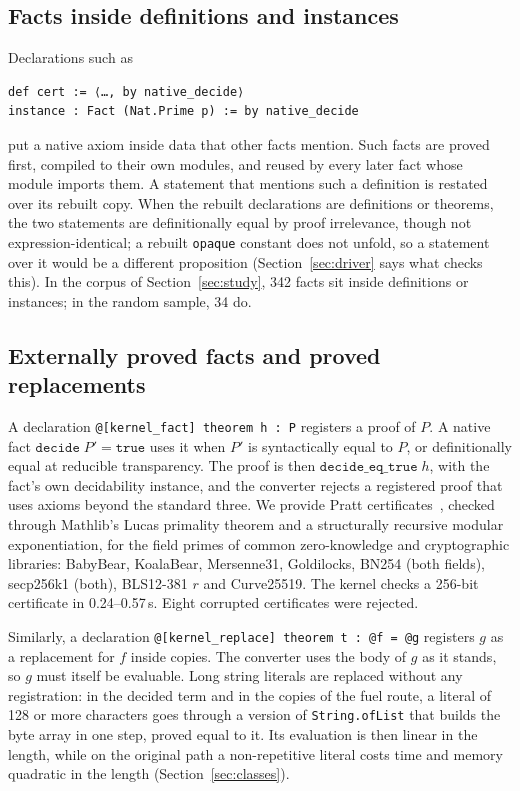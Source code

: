 \documentclass[11pt]{article}
\begin{document}
\subsection{Facts inside definitions and instances}\label{sec:inner}
Declarations such as
\begin{lstlisting}
def cert := ⟨…, by native_decide⟩
instance : Fact (Nat.Prime p) := by native_decide
\end{lstlisting}
\noindent put a native axiom inside data that other facts mention. Such facts are proved first, compiled to
their own modules, and reused by every later fact whose module imports them. A statement that
mentions such a definition is restated over its rebuilt copy. When the rebuilt declarations are
definitions or theorems, the two statements are definitionally equal by proof irrelevance, though not
expression-identical; a rebuilt \texttt{opaque} constant does not unfold, so a statement over it would be
a different proposition (Section~\ref{sec:driver} says what checks this). In the corpus of
Section~\ref{sec:study}, 342 facts sit inside definitions or instances; in the random sample, 34 do.

\subsection{Externally proved facts and proved replacements}\label{sec:external}
A declaration \verb|@[kernel_fact] theorem h : P| registers a proof of \(P\). A native fact
\(\mathtt{decide}\;P' = \mathtt{true}\) uses it when \(P'\) is syntactically equal to \(P\), or
definitionally equal at reducible transparency. The proof is then
\(\mathtt{decide\_eq\_true}\;h\), with the fact's own decidability instance, and the converter
rejects a registered proof that uses axioms beyond the standard three. We provide Pratt
certificates~\cite{pratt}, checked through Mathlib's Lucas primality theorem and a structurally
recursive modular exponentiation, for the field primes of common zero-knowledge and cryptographic
libraries: BabyBear, KoalaBear, Mersenne31, Goldilocks, BN254 (both fields), secp256k1 (both),
BLS12-381 \(r\) and Curve25519. The kernel checks a 256-bit certificate in 0.24--0.57\,s. Eight
corrupted certificates were rejected.

Similarly, a declaration \verb|@[kernel_replace] theorem t : @f = @g| registers \(g\) as a replacement for \(f\) inside
copies. The converter uses the body of \(g\) as it stands, so \(g\) must itself be evaluable. Long string
literals are replaced without any registration: in the decided term and in the copies of the fuel route, a
literal of 128 or more characters goes through a version of \texttt{String.ofList} that builds the byte array
in one step, proved equal to it. Its evaluation is then linear in the length, while on the original path a
non-repetitive literal costs time and memory quadratic in the length (Section~\ref{sec:classes}).
\end{document}
